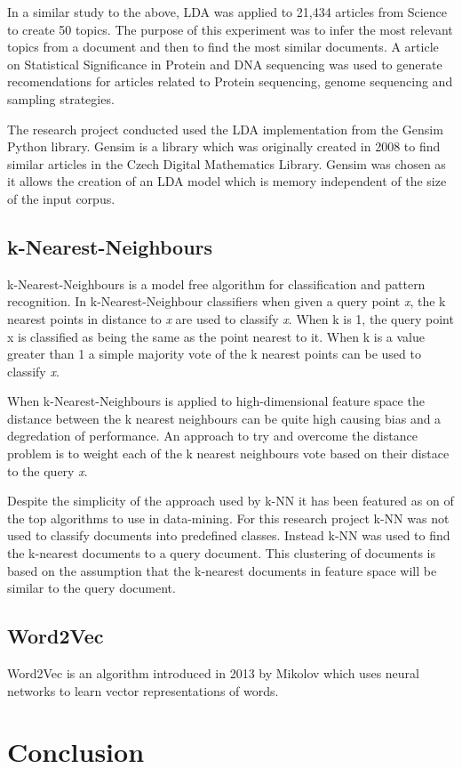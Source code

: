 In a similar study to the above, LDA was applied to 21,434 articles from Science to create 50 topics.
The purpose of this experiment was to infer the most relevant topics from a document and then to find the most similar documents.
A article on Statistical Significance in Protein and DNA sequencing was used to generate recomendations for articles related to Protein sequencing, genome sequencing and sampling strategies.

The research project conducted used the LDA implementation from the Gensim Python library.
Gensim is a library which was originally created in 2008 to find similar articles in the Czech Digital Mathematics Library.
Gensim was chosen as it allows the creation of an LDA model which is memory independent of the size of the input corpus.
\cite{rehurek_lrec}


\subsection{k-Nearest-Neighbours}
k-Nearest-Neighbours is a model free algorithm for classification and pattern recognition.
In k-Nearest-Neighbour classifiers when given a query point \textit{x}, the k nearest points in distance to \textit{x} are used to classify \textit{x}.
When k is 1, the query point x is classified as being the same as the point nearest to it.
When k is a value greater than 1 a simple majority vote of the k nearest points can be used to classify \textit{x}\cite{elementsStat}.

When k-Nearest-Neighbours is applied to high-dimensional feature space the distance between the k nearest neighbours can be quite high causing bias and a degredation of performance\cite{elementsStat}.
An approach to try and overcome the distance problem is to weight each of the k nearest neighbours vote based on their distace to the query \textit{x}\cite{top10datamining}.

Despite the simplicity of the approach used by k-NN it has been featured as on of the top algorithms to use in data-mining\cite{top10datamining}.
For this research project k-NN was not used to classify documents into predefined classes.
Instead k-NN was used to find the k-nearest documents to a query document.
This clustering of documents is based on the assumption that the k-nearest documents in feature space will be similar to the query document.

\subsection{Word2Vec}
Word2Vec is an algorithm introduced in 2013 by Mikolov which uses neural networks to learn vector representations of words.


\section{Conclusion}
